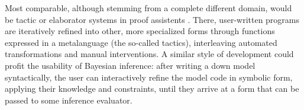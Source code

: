 Most comparable, although stemming from a complete different domain, would be tactic or elaborator
systems in proof assistents \parencite[e.g.,][]{brady2013idris,coqdevelopmentteam2010coq}.  There,
user-written programs are iteratively refined into other, more specialized forms through functions
expressed in a metalanguage (the so-called tactics), interleaving automated transformations and
manual interventions.  A similar style of development could profit the usability of Bayesian
inference: after writing a down model syntactically, the user can interactively refine the model
code in symbolic form, applying their knowledge and constraints, until they arrive at a form that
can be passed to some inference evaluator.

